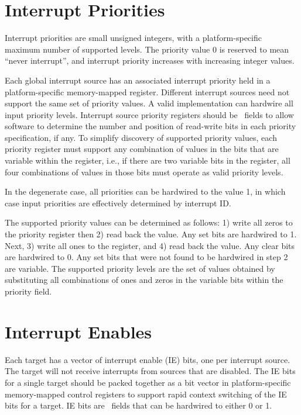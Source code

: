\section{Interrupt Priorities}

Interrupt priorities are small unsigned integers, with a
platform-specific maximum number of supported levels.  The priority
value 0 is reserved to mean ``never interrupt'', and interrupt
priority increases with increasing integer values.

Each global interrupt source has an associated interrupt priority held
in a platform-specific memory-mapped register.  Different interrupt
sources need not support the same set of priority values.  A valid
implementation can hardwire all input priority levels.  Interrupt
source priority registers should be \warl\ fields to allow software to
determine the number and position of read-write bits in each priority
specification, if any.  To simplify discovery of supported priority
values, each priority register must support any combination of values
in the bits that are variable within the register, i.e., if there are
two variable bits in the register, all four combinations of values in
those bits must operate as valid priority levels.

\begin{commentary}
 In the degenerate case, all priorities can be hardwired to the value
 1, in which case input priorities are effectively determined by
 interrupt ID.

 The supported priority values can be determined as follows: 1) write
 all zeros to the priority register then 2) read back the value.  Any
 set bits are hardwired to 1.  Next, 3) write all ones to the
 register, and 4) read back the value.  Any clear bits are hardwired
 to 0.  Any set bits that were not found to be hardwired in step 2 are
 variable.  The supported priority levels are the set of values
 obtained by substituting all combinations of ones and zeros in the
 variable bits within the priority field.
\end{commentary}

\section{Interrupt Enables}

Each target has a vector of interrupt enable (IE) bits, one per
interrupt source.  The target will not receive interrupts from sources
that are disabled.  The IE bits for a single target should be packed
together as a bit vector in platform-specific memory-mapped control
registers to support rapid context switching of the IE bits for a
target.  IE bits are \warl\ fields that can be hardwired to either 0
or 1.

